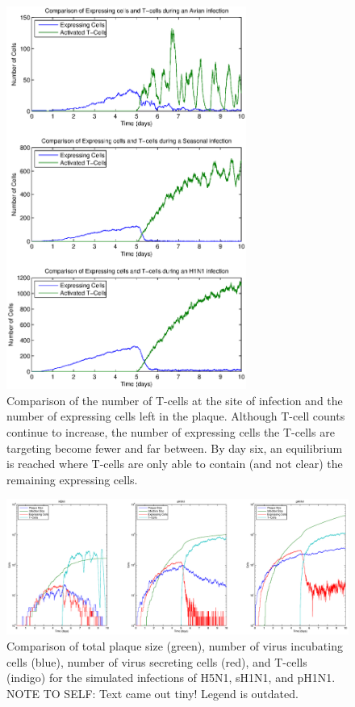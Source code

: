\documentclass[10pt]{article}
\begin{document}
\begin{figure}[ht!]
\begin{center}
 \includegraphics[width=0.7\textwidth]{searcharea}
 \end{center}
\caption{Comparison of the number of T-cells at the site of infection and the number of expressing cells left in the plaque.  Although T-cell counts continue to increase, the number of expressing cells the T-cells are targeting become fewer and far between.  By day six, an equilibrium is reached where T-cells are only able to contain (and not clear) the remaining expressing cells. } 
 \label{fig:searcharea}
\end{figure}


\begin{figure}[ht!]
\begin{center}
 \includegraphics[width=\textwidth]{plaquesize}
 \end{center}
\caption{Comparison of total plaque size (green), number of virus incubating cells (blue), number of virus secreting cells (red), and T-cells (indigo) for the simulated infections of H5N1, sH1N1, and pH1N1.  NOTE TO SELF: Text came out tiny!  Legend is outdated.} 
 \label{fig:plaquesize}
\end{figure}
\end{document}
